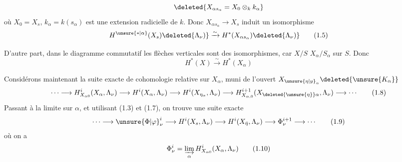 \[
\deleted{X_{\alpha s_\alpha}=X_0\otimes_k k_\alpha}
\]
où $X_0=X_s$,  $k_\alpha=k(s_\alpha)$ est une extension  radicielle de $k$. Donc $X_{\alpha s_\alpha}\longrightarrow X_s$ induit un isomorphisme
\[
H^{\unsure{*|\alpha}}(X_s)\deleted{\Lambda_\nu)}\xrightarrow{\sim}H^*(X_{\alpha s_\alpha})\deleted{\Lambda_\nu)}
\tag*{(1.5)}
\]

D'autre part,  dans le diagramme commutatif
les flèches verticales sont  des isomorphismes, car $X/S$  $X_\alpha/S_\alpha$  sur $S$. Donc
\[
H^*(X)\xrightarrow{\sim}H^*(X_\alpha)
\tag*{(1.7)}
\]

Considérons maintenant la suite exacte de cohomologie relative sur $X_\alpha$, muni de l'ouvert $X_{{\unsure{\eta|y}}_\alpha}\deleted{\unsure{K_\alpha}}$
\[
\cdots\longrightarrow H^i_{X_{\alpha0}}(X_\alpha,\Lambda_\nu)\longrightarrow H^i(X_\alpha,\Lambda_\nu)\longrightarrow H^i(X_{\eta_\alpha},\Lambda_\nu)\longrightarrow H^{i+1}_{X_{\alpha,0}}(X_{\deleted{\unsure{\eta}}\alpha},\Lambda_\nu)\longrightarrow\cdots
\tag*{(1.8)}
\]
Passant à la limite sur $\alpha$, et utilisant (1.3) et (1.7), on trouve une suite exacte
\[
\cdots\longrightarrow{\unsure{\Phi|\varphi}}^i_\nu\longrightarrow H^i(X_s,\Lambda_\nu)\longrightarrow H^i(X_{\bar\eta},\Lambda_\nu)\longrightarrow\Phi^{i+1}_\nu\longrightarrow\cdots
\tag*{(1.9)}
\]
où on a
\[
\Phi^i_\nu=\varinjlim_\alpha H^i_{X_{\alpha0}}(X_\alpha,\Lambda_\nu)
\tag*{(1.10)}
\]
